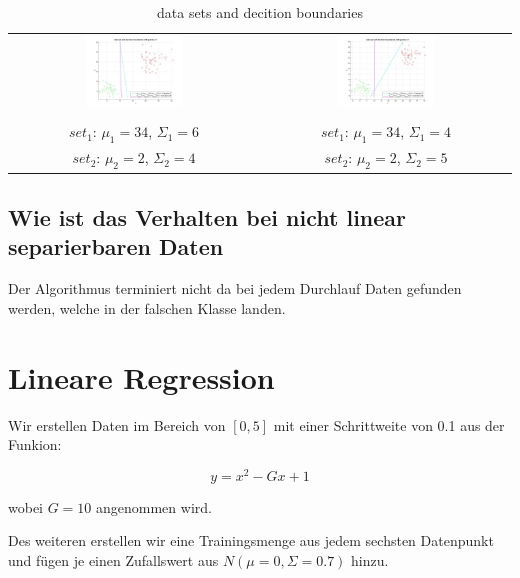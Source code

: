 \documentclass[]{report}
\begin{document}
\begin{table}[h]
\begin{tabular}{| c | c |}
\includegraphics[width=0.4\textwidth]{./images/DataSetAndDecisionBoundary_310.jpg} & \includegraphics[width=0.4\textwidth]{./images/DataSetAndDecisionBoundary_410.jpg} \\
 & \\
$set_1$: $\mu_1=34$, $\Sigma_1=6$ & $set_1$: $\mu_1=34$, $\Sigma_1=4$ \\
$set_2$: $\mu_2=2$, $\Sigma_2=4$ & $set_2$: $\mu_2=2$, $\Sigma_2=5$ \\
\hline
\end{tabular}
\caption{data sets and decition boundaries}
\label{tab:DataSetsAndBounds}
\end{table}

\section{Wie ist das Verhalten bei nicht linear separierbaren Daten}

Der Algorithmus terminiert nicht da bei jedem Durchlauf Daten gefunden werden, welche in der falschen Klasse landen.

\chapter{Lineare Regression}

Wir erstellen Daten im Bereich von $[0,5]$ mit einer Schrittweite von 0.1 aus der Funkion:

\begin{equation}
y=x^2-Gx+1
\end{equation}

wobei $G=10$ angenommen wird.

Des weiteren erstellen wir eine Trainingsmenge aus jedem sechsten Datenpunkt und f\"ugen je einen Zufallswert aus $N(\mu=0,\Sigma=0.7)$ hinzu.
\end{document}
